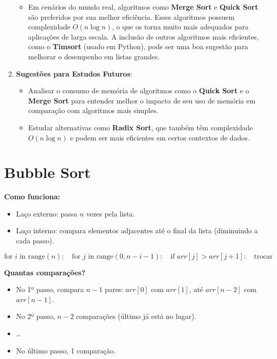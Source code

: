\documentclass[12pt, a4paper]{report}
\begin{document}
\begin{enumerate}
\begin{itemize}
        \item Em cenários do mundo real, algoritmos como \textbf{Merge Sort} e \textbf{Quick Sort} são preferidos por sua melhor eficiência. Esses algoritmos possuem complexidade \(O(n \log n)\), o que os torna muito mais adequados para aplicações de larga escala. A inclusão de outros algoritmos mais eficientes, como o \textbf{Timsort} (usado em Python), pode ser uma boa sugestão para melhorar o desempenho em listas grandes.
    \end{itemize}
    
    \item \textbf{Sugestões para Estudos Futuros}: 
    \begin{itemize}
        
        \item Analisar o consumo de memória de algoritmos como o \textbf{Quick Sort} e o \textbf{Merge Sort} para entender melhor o impacto de seu uso de memória em comparação com algoritmos mais simples.
        
        \item Estudar alternativas como \textbf{Radix Sort}, que também têm complexidade \(O(n \log n)\) e podem ser mais eficientes em certos contextos de dados.
    \end{itemize}
\end{enumerate}
\section*{Bubble Sort}

\textbf{Como funciona:}
\begin{itemize}
    \item Laço externo: passa $n$ vezes pela lista.
    \item Laço interno: compara elementos adjacentes até o final da lista (diminuindo a cada passo).
\end{itemize}

\[
\text{for } i \text{ in range}(n): 
\quad \text{for } j \text{ in range}(0, n - i - 1):
\quad \text{if } arr[j] > arr[j+1]:
\quad \text{trocar}
\]

\textbf{Quantas comparações?}

\begin{itemize}
    \item No 1º passo, compara $n - 1$ pares: $arr[0]$ com $arr[1]$, até $arr[n-2]$ com $arr[n-1]$.
    \item No 2º passo, $n - 2$ comparações (último já está no lugar).
    \item \dots
    \item No último passo, 1 comparação.
\end{itemize}
\end{document}
